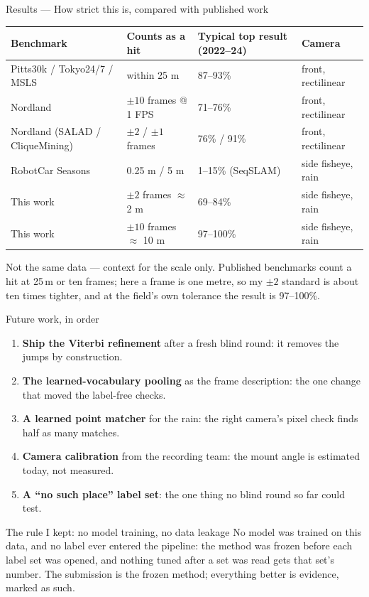 \documentclass[10pt,aspectratio=169]{beamer}
\begin{document}
\begin{frame}{Results --- How strict this is, compared with published work}
\begin{center}\footnotesize
\setlength{\tabcolsep}{4pt}
\begin{tabular}{llll}
\toprule
Benchmark & Counts as a hit & Typical top result (2022--24) & Camera \\
\midrule
Pitts30k / Tokyo24/7 / MSLS & within 25 m & 87--93\% & front, rectilinear \\
Nordland & $\pm10$ frames @ 1 FPS & 71--76\% & front, rectilinear \\
Nordland (SALAD / CliqueMining) & $\pm2$ / $\pm1$ frames & 76\% / 91\% & front, rectilinear \\
RobotCar Seasons & 0.25 m / 5 m & 1--15\% (SeqSLAM) & side fisheye, rain \\
\midrule
This work & $\pm2$ frames $\approx$ 2 m & 69--84\% & side fisheye, rain \\
This work & $\pm10$ frames $\approx$ 10 m & 97--100\% & side fisheye, rain \\
\bottomrule
\end{tabular}
\end{center}
\small Not the same data --- context for the scale only. Published benchmarks count a hit at 25\,m or ten frames; here a frame is one metre, so my $\pm2$ standard is about ten times tighter, and at the field's own tolerance the result is 97--100\%.
\end{frame}

\begin{frame}{Future work, in order}
\begin{enumerate}\setlength{\itemsep}{3pt}
  \item \textbf{Ship the Viterbi refinement} after a fresh blind round: it removes the jumps by construction.
  \item \textbf{The learned-vocabulary pooling} as the frame description: the one change that moved the label-free checks.
  \item \textbf{A learned point matcher} for the rain: the right camera's pixel check finds half as many matches.
  \item \textbf{Camera calibration} from the recording team: the mount angle is estimated today, not measured.
  \item \textbf{A ``no such place'' label set}: the one thing no blind round so far could test.
\end{enumerate}
\begin{block}{The rule I kept: no model training, no data leakage}
No model was trained on this data, and no label ever entered the pipeline: the method was frozen before each label set was opened, and nothing tuned after a set was read gets that set's number. The submission is the frozen method; everything better is evidence, marked as such.
\end{block}
\end{frame}
\end{document}
